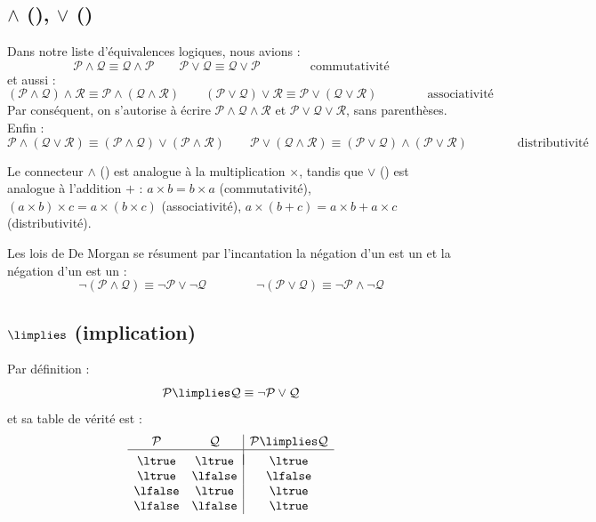 \documentclass[11pt,class=report,crop=false]{standalone}
\begin{document}
\subsection{$\land$ (\tand), $\lor$ (\tor)}

Dans notre liste d'équivalences logiques, nous avions :
\[ \mathcal{P} \land \mathcal{Q} \equiv \mathcal{Q} \land \mathcal{P}\qquad \mathcal{P} \lor \mathcal{Q} \equiv \mathcal{Q} \lor \mathcal{P} \qquad\qquad \text{commutativité} \]
et aussi :
\[ (\mathcal{P} \land \mathcal{Q}) \land \mathcal{R} \equiv \mathcal{P} \land (\mathcal{Q} \land \mathcal{R}) 
\qquad 
(\mathcal{P} \lor \mathcal{Q}) \lor \mathcal{R} \equiv \mathcal{P} \lor (\mathcal{Q} \lor \mathcal{R}) 
\qquad\qquad \text{associativité} \]
Par conséquent, on s'autorise à écrire $\mathcal{P} \land \mathcal{Q} \land \mathcal{R}$ et $\mathcal{P} \lor \mathcal{Q} \lor \mathcal{R}$, sans parenthèses.
Enfin :
\[ \mathcal{P} \land (\mathcal{Q} \lor \mathcal{R}) \equiv (\mathcal{P} \land \mathcal{Q}) \lor (\mathcal{P} \land \mathcal{R}) \qquad \mathcal{P} \lor (\mathcal{Q} \land \mathcal{R}) \equiv (\mathcal{P} \lor \mathcal{Q}) \land (\mathcal{P} \lor \mathcal{R}) \qquad\qquad \text{distributivité} \]

\medskip

Le connecteur $\land$ (\tand) est analogue à la multiplication $\times$, tandis que $\lor$ (\tor) est analogue à l'addition $+$ :
$a \times b = b \times a$ (commutativité), $(a \times b) \times c = a \times (b \times c)$ (associativité), $a \times (b+c) = a \times b + a \times c$ (distributivité).

Les lois de De Morgan se résument par l'incantation \og{}la négation d'un \tand{} est un \tor\fg{} et \og{}la négation d'un \tor{} est un \tand\fg{} :
\[ \lnot(\mathcal{P} \land \mathcal{Q}) \equiv \lnot\mathcal{P} \lor \lnot\mathcal{Q}
\qquad\qquad \lnot(\mathcal{P} \lor \mathcal{Q}) \equiv \lnot\mathcal{P} \land \lnot\mathcal{Q}
 \]

\subsection{$\limplies$ (implication)}

Par définition :
\[
\mathcal{P} \limplies \mathcal{Q} \equiv \lnot \mathcal{P} \lor \mathcal{Q}
\]
et sa table de vérité est :
\[
\begin{array}{c c | c}
	\mathcal{P}		& \mathcal{Q} 		& \mathcal{P} \limplies \mathcal{Q} \\
	\hline
	&&	\\[-2ex]
	\ltrue 	& \ltrue 	& \ltrue \\
	\ltrue 	& \lfalse 	& \lfalse \\
	\lfalse & \ltrue 	& \ltrue \\	
	\lfalse & \lfalse 	& \ltrue \\		
\end{array}
\]
\end{document}
